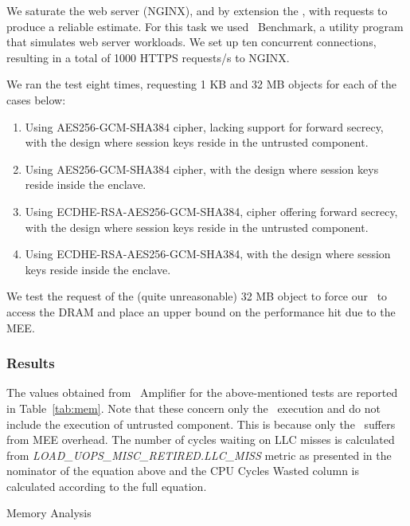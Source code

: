 \documentclass[../../../main.tex]{subfiles}
\begin{document}
We saturate the web server (NGINX), and by extension the \enclavemodel, with
requests to produce a reliable estimate. For this task we used
\Apache~Benchmark, a utility program that simulates web server workloads. We
set up ten concurrent connections, resulting in a total of 1000 HTTPS
requests/s to NGINX.

We ran the test eight times, requesting 1 KB and 32 MB objects for each of the
cases below:
\begin{enumerate}
  \item Using AES256-GCM-SHA384 cipher, lacking support for forward secrecy,
    with the design where session keys reside in the untrusted component.
  \item Using AES256-GCM-SHA384 cipher, with the design where session keys
    reside inside the enclave.
  \item Using ECDHE-RSA-AES256-GCM-SHA384, cipher offering forward secrecy, with
    the design where session keys reside in the untrusted component.
  \item Using ECDHE-RSA-AES256-GCM-SHA384, with the design where session keys
    reside inside the enclave.
\end{enumerate}

We test the request of the (quite unreasonable) 32 MB object to force our
\enclavemodel~to access the DRAM and place an upper bound on the performance
hit due to the MEE.

\subsubsection*{Results}
The values obtained from \VTune~Amplifier for the above-mentioned tests are
reported in Table~\ref{tab:mem}. Note that these concern only the
\enclavemodel~execution and do not include the execution of untrusted
component. This is because only the \enclaveprogram~suffers from MEE overhead.
The number of cycles waiting on LLC misses is calculated from
\textit{LOAD\_UOPS\_MISC\_RETIRED.LLC\_MISS} metric as presented in the
nominator of the equation above and the CPU Cycles Wasted column is calculated
according to the full equation.

\begin{table}[H]
  \caption{Memory Analysis}
  \label{tab:mem}
\end{table}
\end{document}

